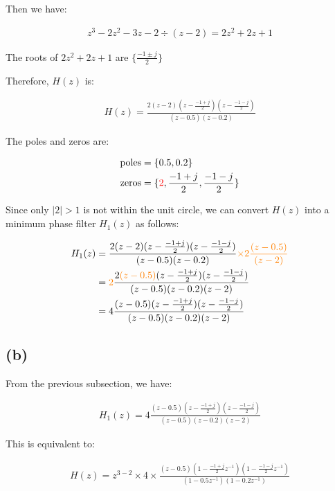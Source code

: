 \documentclass{article}
\begin{document}
Then we have:

\begin{align*}
    z^3 - 2z^2 -3z - 2 \div (z - 2) = 2z^2 + 2z + 1
\end{align*}

The roots of $2z^2 + 2z + 1$ are $\{\frac{-1 \pm j}{2}\}$

Therefore, $H(z)$ is:

\begin{align*}
    H(z) = \frac{2(z - 2)(z - \frac{-1 + j}{2})(z - \frac{-1 - j}{2})}{(z - 0.5)(z - 0.2)} 
\end{align*}

The poles and zeros are:

\begin{align*}
    \text{poles} &= \{0.5, 0.2\} \\
    \text{zeros} &= \{\textcolor{red}{2}, \frac{-1 + j}{2}, \frac{-1 - j}{2}\}
\end{align*}

Since only $|2| > 1$ is not within the unit circle, 
we can convert $H(z)$ into a minimum phase filter $H_1(z)$ as follows:

\begin{align*}
    H_1(z) 
    &= \frac{2(z - 2)(z - \frac{-1 + j}{2})(z - \frac{-1 - j}{2})}{(z - 0.5)(z - 0.2)} \textcolor{orange}{\times 2 \frac{(z - 0.5)}{(z - 2)}} \\
    &= \textcolor{orange}{2} \frac{2\textcolor{orange}{(z - 0.5)}(z - \frac{-1 + j}{2})(z - \frac{-1 - j}{2})}{(z - 0.5)(z - 0.2)(z - 2)} \\
    &= 4 \frac{(z - 0.5)(z - \frac{-1 + j}{2})(z - \frac{-1 - j}{2})}{(z - 0.5)(z - 0.2)(z - 2)}
\end{align*}

\subsection*{(b)}

From the previous subsection, we have:

\begin{align*}
    H_1(z) = 4 \frac{(z - 0.5)(z - \frac{-1 + j}{2})(z - \frac{-1 - j}{2})}{(z - 0.5)(z - 0.2)(z - 2)}
\end{align*}

This is equivalent to:

\begin{align*}
    H(z) = z^{3 - 2} \times 4 \times \frac{(z - 0.5)(1 - \frac{-1 + j}{2}z^{-1})(1 - \frac{-1 - j}{2}z^{-1})}{(1 - 0.5z^{-1})(1 - 0.2z^{-1})} 
\end{align*}
\end{document}
